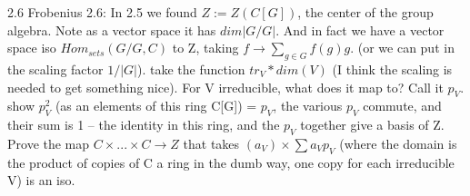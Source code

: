 \documentclass{article}
\begin{document}
\begin{PROB}{2.6}\label{Problem 2.6.}
    Frobenius 2.6:  In 2.5 we found $Z:=  Z(C[G])$, the center of the group algebra. Note as a vector space it has $dim |G/G|$.   And in fact we have a vector space iso   $Hom_{sets}(G/G,C)$ to Z, taking  $f \to \sum_{g \in G} f(g) g$. (or we can put in the scaling factor $1/|G|$).  take the function $tr_V * dim(V)$  (I think the scaling is needed to get something nice). For V irreducible, what does it map to? Call it $p_V$. show $p_V^2$ (as an elements of this ring C[G]) = $p_V$, the various $p_V$ commute, and their sum is 1 -- the identity in this ring, and the $p_V$ together give a basis of Z.  Prove the map $C \times ... \times C \to Z$ that takes $(a_V) \times \sum a_V p_V$  (where the domain is the product of copies of C a ring in the dumb way, one copy for each irreducible V) is an iso. 
\end{PROB}
\end{document}

